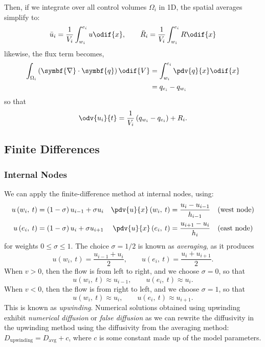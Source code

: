 \documentclass{article}
\begin{document}
Then, if we integrate over all control volumes \(\Omega_i\) in 1D, the
spatial averages simplify to:
\begin{equation*}
    \bar{u}_i = \frac{1}{V_i} \int_{w_i}^{e_i} u \odif{x}, \qquad \bar{R}_i = \frac{1}{V_i} \int_{w_i}^{e_i} R \odif{x}
\end{equation*}
likewise, the flux term becomes,
\begin{align*}
    \int_{\Omega_i} \left( \symbf{\nabla} \cdot \symbf{q} \right) \odif{V} & = \int_{w_i}^{e_i} \pdv{q}{x} \odif{x} \\
                                                                           & = q_{e_i} - q_{w_i}
\end{align*}
so that
\begin{equation*}
    \odv{u_i}{t} = \frac{1}{V_i} \left( q_{w_i} - q_{e_i} \right) + R_i.
\end{equation*}
\subsection{Finite Differences}
\subsubsection{Internal Nodes}
We can apply the finite-difference method at internal nodes, using:
\begin{align*}
    u\left( w_i,\: t \right) & = \left( 1 - \sigma \right)  u_{i-1} + \sigma u_i & \pdv{u}{x}\left( w_i,\: t \right) & = \frac{u_i - u_{i-1}}{h_{i-1}} &  & \text{(west node)} \\
    u\left( e_i,\: t \right) & = \left( 1 - \sigma \right)  u_i + \sigma u_{i+1} & \pdv{u}{x}\left( e_i,\: t \right) & = \frac{u_{i+1} - u_i}{h_i}     &  & \text{(east node)}
\end{align*}
for weights \(0 \leqslant \sigma \leqslant 1\). The choice
\(\sigma = 1/2\) is known as \textit{averaging}, as it produces
\begin{equation*}
    u\left( w_i,\: t \right) = \frac{u_{i-1} + u_i}{2}, \qquad u\left( e_i,\: t \right) = \frac{u_i + u_{i+1}}{2}.
\end{equation*}
When \(v > 0\), then the flow is from left to right, and we choose \(\sigma
= 0\), so that
\begin{equation*}
    u\left( w_i,\: t \right) \approx u_{i-1}, \qquad u\left( e_i,\: t \right) \approx u_i.
\end{equation*}
When \(v < 0\), then the flow is from right to left, and we choose
\(\sigma = 1\), so that
\begin{equation*}
    u\left( w_i,\: t \right) \approx u_i, \qquad u\left( e_i,\: t \right) \approx u_{i+1}.
\end{equation*}
This is known as \textit{upwinding}. Numerical solutions obtained using
upwinding exhibit \textit{numerical diffusion} or \textit{false diffusion}
as we can rewrite the diffusivity in the upwinding method using the
diffusivity from the averaging method:
\(D_{\text{upwinding}} = D_{\text{avg}} + c\), where \(c\) is some
constant made up of the model parameters.
\end{document}
